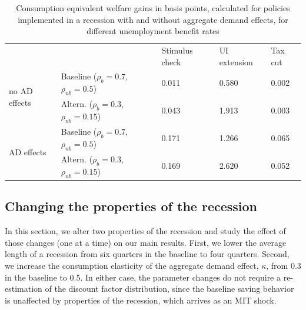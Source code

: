 \documentclass[\econtexRoot/EGMN]{subfiles}
\begin{document}
\begin{table}[]
    \begin{center}
        \begin{tabular}{@{}lllll@{}}
            \toprule
                                           &                                             & Stimulus check & UI extension & Tax cut \\ \cmidrule(l){1-5}
            \multirow{2}{*}{no AD effects} & Baseline  ($\rho_{b}=0.7$, $\rho_{nb}=0.5$) & 0.011          & 0.580        & 0.002   \\
                                           & Altern.  ($\rho_{b}=0.3$, $\rho_{nb}=0.15$) & 0.043          & 1.913        & 0.003   \\ \cmidrule(l){1-5}
            \multirow{2}{*}{AD effects}    & Baseline  ($\rho_{b}=0.7$, $\rho_{nb}=0.5$) & 0.171          & 1.266        & 0.065   \\
                                           & Altern.  ($\rho_{b}=0.3$, $\rho_{nb}=0.15$) & 0.169          & 2.620        & 0.052   \\ \cmidrule(l){1-5}
        \end{tabular}
        \caption{Consumption equivalent welfare gains in basis points, calculated for policies implemented in a recession with and without aggregate demand effects, for different unemployment benefit rates}
        \notinsubfile{\label{tab:robustness_benefit_results}}
    \end{center}
\end{table}




\FloatBarrier
\hypertarget{changing-the-properties-of-the-recession}{}\par\subsection{Changing the properties of the recession}

In this section, we alter two properties of the recession and study the effect of those changes (one at a time) on our main results. First, we lower the average length of a recession from six quarters in the baseline to four quarters. Second, we increase the consumption elasticity of the aggregate demand effect, $\kappa$, from 0.3 in the baseline to 0.5. In either case, the parameter changes do not require a re-estimation of the discount factor distribution, since the baseline saving behavior is unaffected by properties of the recession, which arrives as an MIT shock.
\end{document}

